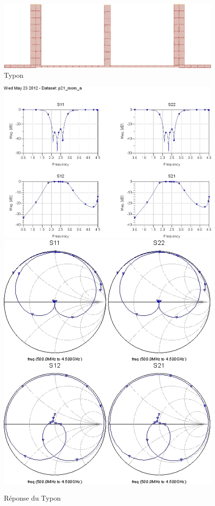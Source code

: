 \documentclass[10pt]{article}
\begin{document}
\begin{figure}
    \begin{center}
        \includegraphics[width=15cm]{typon-white}
    \end{center}
    \caption{Typon}
\end{figure}

\begin{figure}
    \begin{center}
        \includegraphics[width=14cm]{last_simu}
        \includegraphics{last_simu2}
    \end{center}
    \caption{Réponse du Typon}
\end{figure}
\end{document}
